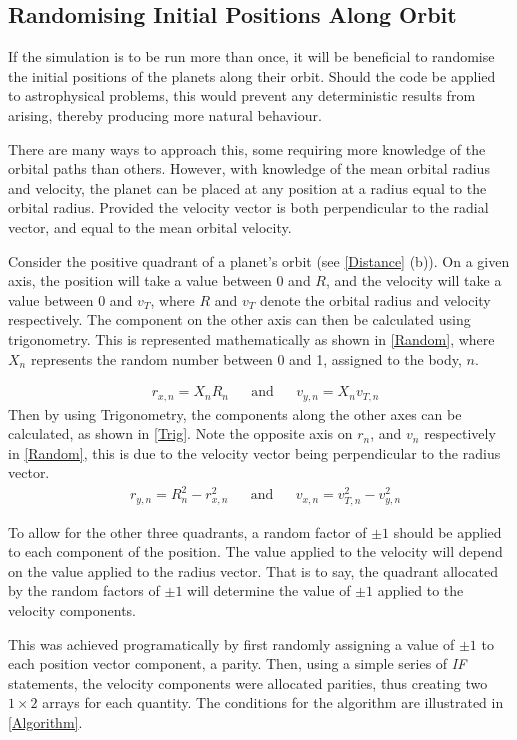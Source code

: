 \documentclass[a4paper,10pt]{article}
\begin{document}
\subsection{Randomising Initial Positions Along Orbit}

If the simulation is to be run more than once, it will be beneficial to randomise the initial positions of the planets along their orbit. Should the code be applied to astrophysical problems, this would prevent any deterministic results from arising, thereby producing more natural behaviour. 

There are many ways to approach this, some requiring more knowledge of the orbital paths than others. However, with knowledge of the mean orbital radius and velocity, the planet can be placed at any position at a radius equal to the orbital radius. Provided the velocity vector is both perpendicular to the radial vector, and equal to the mean orbital velocity. 

Consider the positive quadrant of a planet's orbit (see \cref{Distance} (b)). On a given axis, the position will take a value between 0 and $R$, and the velocity will take a value between 0 and $v_T$, where $R$ and $v_T$ denote the orbital radius and velocity respectively. The component on the other axis can then be calculated using trigonometry. This is represented mathematically as shown in \cref{Random}, where $X_n$ represents the random number between 0 and 1, assigned to the body, $n$.

\begin{align}\label{Random}
&r_{x,n} = X_n R_n&
&\text{and}&
&v_{y,n} = X_n v_{T,n}
\end{align}
Then by using Trigonometry, the components along the other axes can be calculated, as shown in \cref{Trig}. Note the opposite axis on $r_n$, and $v_n$ respectively in \cref{Random}, this is due to the velocity vector being perpendicular to the radius vector.
\begin{align}\label{Trig}
&r_{y,n} = R_n^2 - r_{x,n}^2&
&\text{and}&
&v_{x,n} = v_{T,n}^2 - v_{y,n}^2
\end{align}

To allow for the other three quadrants, a random factor of $\pm 1$ should be applied to each component of the position. The value applied to the velocity will depend on the value applied to the radius vector. That is to say, the quadrant allocated by the random factors of $\pm1$ will determine the value of $\pm1$ applied to the velocity components. 

This was achieved programatically by first randomly assigning a value of $\pm 1$ to each position vector component, a parity. Then, using a simple series of \textit{IF} statements, the velocity components were allocated parities, thus creating two $1\times 2$ arrays for each quantity. The conditions for the algorithm are illustrated in \cref{Algorithm}.
\end{document}
